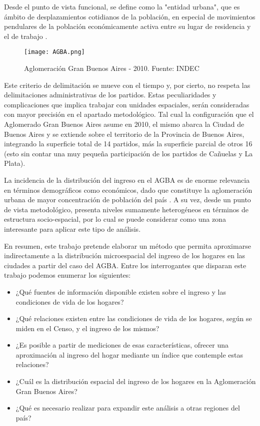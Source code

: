 Desde el punto de vista funcional, se define como la "entidad urbana", que es ámbito de desplazamientos cotidianos de la población, en especial de movimientos pendulares de la población económicamente activa entre su lugar de residencia y el de trabajo \cite{bertoncello,torres1990}.


\begin{figure}[t]
	\begin{center}
		\texttt{[image: AGBA.png]}
		\caption{Aglomeración Gran Buenos Aires - 2010. Fuente: INDEC}
	\end{center}
\end{figure}

Este criterio de delimitación se mueve con el tiempo y, por cierto, no respeta las delimitaciones administrativas de los partidos.  Estas peculiaridades y complicaciones que implica trabajar con unidades espaciales, serán consideradas con mayor precisión en el apartado metodológico. Tal cual la configuración que el Aglomerado Gran Buenos Aires asume en 2010, el mismo abarca la Ciudad de Buenos Aires y se extiende sobre el territorio de la Provincia de Buenos Aires, integrando la superficie total de 14 partidos, más la superficie parcial de otros 16 (esto sin contar una muy pequeña participación de los partidos de Cañuelas y La Plata).

La incidencia de la distribución del ingreso en el AGBA es de enorme relevancia en términos demográficos como económicos, dado que constituye la aglomeración urbana de mayor concentración de población del país \cite{indec2012}. A su vez, desde un punto de vista metodológico, presenta niveles sumamente heterogéneos en términos de estructura socio-espacial, por lo cual se puede considerar como una zona interesante para aplicar este tipo de análisis. 

En resumen, este trabajo pretende elaborar un método que permita aproximarse indirectamente a la distribución microespacial del ingreso de los hogares en las ciudades a partir del caso del AGBA. Entre los interrogantes que disparan este trabajo podemos enumerar los siguientes: 

\begin{itemize}
	\item ¿Qué fuentes de información disponible existen sobre el ingreso y las condiciones de vida de los hogares?
	\item ¿Qué relaciones existen entre las condiciones de vida de los hogares, según se miden en el Censo, y el ingreso de los mismos?
	\item ¿Es posible a partir de mediciones de esas características, ofrecer una aproximación al ingreso del hogar mediante un índice que contemple estas relaciones?
	\item ¿Cuál es la distribución espacial del ingreso de los hogares en la Aglomeración Gran Buenos Aires?
	\item ¿Qué es necesario realizar para expandir este análisis a otras regiones del país?
\end{itemize}

